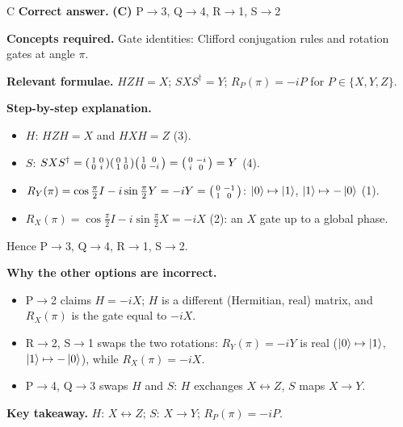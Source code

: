 \documentclass[11pt,a4paper]{article}
\newcommand{\qsep}{\par\vspace{2pt}{\color{black!15}\hrule}\vspace{4pt}}
\begin{document}
\begin{solbox}{C}
\textbf{\color{brand}Correct answer.} \textcolor{okgreen}{\textbf{(C)}} P$\to$3, Q$\to$4, R$\to$1, S$\to$2

\textbf{\color{brand}Concepts required.} Gate identities: Clifford conjugation rules and rotation gates at angle $\pi$.

\textbf{\color{brand}Relevant formulae.} $HZH = X$; $SXS^\dagger = Y$; $R_P(\pi) = -iP$ for $P \in \{X, Y, Z\}$.

\textbf{\color{brand}Step-by-step explanation.} \begin{itemize}\itemsep0pt
\item $H$: $HZH = X$ and $HXH = Z$ (3).
\item $S$: $SXS^\dagger = \begin{psmallmatrix}1&0\\0&i\end{psmallmatrix}\begin{psmallmatrix}0&1\\1&0\end{psmallmatrix}\begin{psmallmatrix}1&0\\0&-i\end{psmallmatrix} = \begin{psmallmatrix}0&-i\\i&0\end{psmallmatrix} = Y$ (4).
\item $R_Y(\pi) = \cos\frac\pi2 I - i\sin\frac\pi2 Y = -iY = \begin{psmallmatrix}0&-1\\1&0\end{psmallmatrix}$: $\ket0\mapsto\ket1$, $\ket1\mapsto-\ket0$ (1).
\item $R_X(\pi) = \cos\frac\pi2 I - i\sin\frac\pi2 X = -iX$ (2): an $X$ gate up to a global phase.
\end{itemize}
Hence P$\to$3, Q$\to$4, R$\to$1, S$\to$2.

\textbf{\color{brand}Why the other options are incorrect.}
\begin{itemize}[leftmargin=2.4em, itemsep=1pt, topsep=2pt]
\item[\textbf{(A)}] P$\to$2 claims $H = -iX$; $H$ is a different (Hermitian, real) matrix, and $R_X(\pi)$ is the gate equal to $-iX$.
\item[\textbf{(B)}] R$\to$2, S$\to$1 swaps the two rotations: $R_Y(\pi) = -iY$ is real ($\ket0\mapsto\ket1$, $\ket1\mapsto-\ket0$), while $R_X(\pi) = -iX$.
\item[\textbf{(D)}] P$\to$4, Q$\to$3 swaps $H$ and $S$: $H$ exchanges $X \leftrightarrow Z$, $S$ maps $X \to Y$.
\end{itemize}
\textbf{\color{brand}Key takeaway.} $H$: $X\leftrightarrow Z$; $S$: $X\to Y$; $R_P(\pi) = -iP$.
\end{solbox}
\qsep
\end{document}
